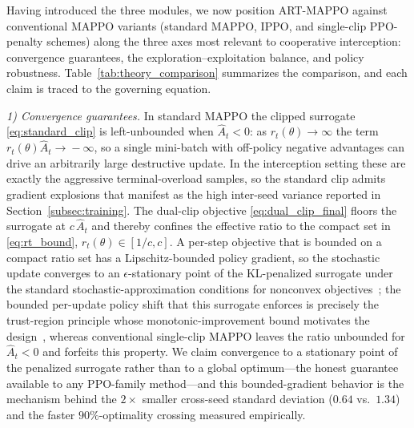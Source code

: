 \documentclass[lettersize,journal]{IEEEtran}
\newcommand{\hladd}[1]{{\color{blue}#1}}
\begin{document}
\hladd{Having introduced the three modules, we now position ART-MAPPO against conventional
MAPPO variants (standard MAPPO, IPPO, and single-clip PPO-penalty schemes) along the three
axes most relevant to cooperative interception: convergence guarantees, the
exploration--exploitation balance, and policy robustness. Table~\ref{tab:theory_comparison}
summarizes the comparison, and each claim is traced to the governing equation.}

\hladd{\emph{1) Convergence guarantees.} In standard MAPPO the clipped surrogate
\eqref{eq:standard_clip} is left-unbounded when $\hat{A}_t<0$: as $r_t(\theta)\!\to\!\infty$
the term $r_t(\theta)\hat{A}_t\!\to\!-\infty$, so a single mini-batch with off-policy negative
advantages can drive an arbitrarily large destructive update. In the interception setting these
are exactly the aggressive terminal-overload samples, so the standard clip admits
gradient explosions that manifest as the high inter-seed variance reported in
Section~\ref{subsec:training}. The dual-clip objective \eqref{eq:dual_clip_final}
floors the surrogate at $c\,\hat{A}_t$ and thereby confines the effective ratio to the compact
set in \eqref{eq:rt_bound}, $r_t(\theta)\in[1/c,c]$. A per-step objective that is bounded on a
compact ratio set has a Lipschitz-bounded policy gradient, so the stochastic update converges to
an $\epsilon$-stationary point of the KL-penalized surrogate under the standard stochastic-approximation
conditions for nonconvex objectives~\cite{ghadimi2013stochastic}; the bounded per-update policy shift
that this surrogate enforces is precisely the trust-region principle whose monotonic-improvement bound
motivates the design~\cite{schulman2015trust}, whereas conventional single-clip MAPPO leaves the ratio
unbounded for $\hat{A}_t\!<\!0$ and forfeits this property. We claim convergence to a stationary point
of the penalized surrogate rather than to a global optimum---the honest guarantee available to any
PPO-family method---and this bounded-gradient behavior is the mechanism behind the $2\times$ smaller
cross-seed standard deviation ($0.64$ vs.\ $1.34$) and the faster $90\%$-optimality crossing measured
empirically.}
\end{document}
